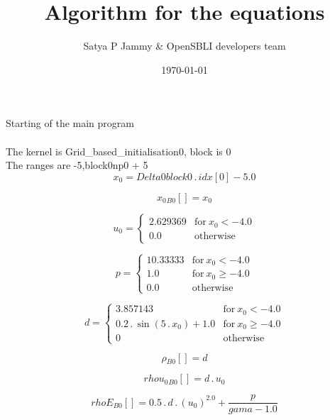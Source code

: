 \documentclass{article}
\title{Algorithm for the equations}
\author{Satya P Jammy \& OpenSBLI developers team}
\date{\today}
\begin{document}
\maketitle
\noindent Starting of the main program\\
\\\noindent The kernel is Grid_based_initialisation0, block is 0\\\noindent The ranges are -5,block0np0 + 5\\\begin{dmath}x_{0} = Delta0block0 \,.\, {idx}[{0}] - 5.0\end{dmath}

\begin{dmath}{x_{0}{_{B0}}}[{}] = x_{0}\end{dmath}

\begin{dmath}u_{0} = \begin{cases} 2.629369 & \text{for}\: x_{0} < -4.0 \\0.0 & \text{otherwise} \end{cases}\end{dmath}

\begin{dmath}p = \begin{cases} 10.33333 & \text{for}\: x_{0} < -4.0 \\1.0 & \text{for}\: x_{0} \geq -4.0 \\0.0 & \text{otherwise} \end{cases}\end{dmath}

\begin{dmath}d = \begin{cases} 3.857143 & \text{for}\: x_{0} < -4.0 \\0.2 \,.\, \sin{\left (5 \,.\, x_{0} \right )} + 1.0 & \text{for}\: x_{0} \geq -4.0 \\0 & \text{otherwise} \end{cases}\end{dmath}

\begin{dmath}{\rho{_{B0}}}[{}] = d\end{dmath}

\begin{dmath}{rhou_{0}{_{B0}}}[{}] = d \,.\, u_{0}\end{dmath}

\begin{dmath}{rhoE{_{B0}}}[{}] = 0.5 \,.\, d \,.\, \left(u_{0} \right)^{2.0} + \frac{p}{gama - 1.0}\end{dmath}
\end{document}

